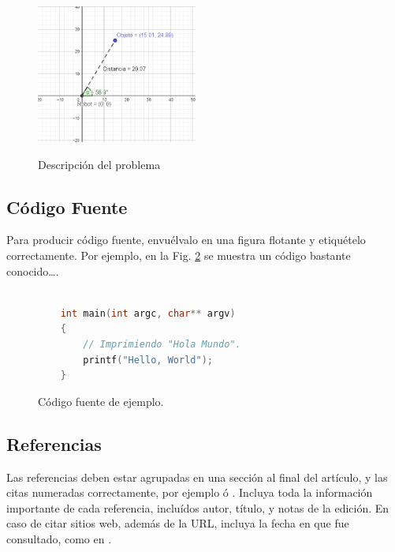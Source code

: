 \documentclass[a4paper,10pt]{article}
\begin{document}
		\begin{figure}[htb]%
		\begin{center}
		\includegraphics[width=200px, height=200px]{images/problem_description.jpg}
		\end{center}
		\caption{Descripción del problema \label{fig:arr}}%
		\end{figure}

	\subsection{Código Fuente}\label{sub:listings}
		Para producir código fuente, envuélvalo en una figura flotante y
		etiquételo correctamente. Por ejemplo, en la Fig. \ref{fig:code}
		se muestra un código bastante conocido\ldots.


		\begin{figure}[htb]%
			\begin{lstlisting}[language=c]%

    int main(int argc, char** argv)
    {
        // Imprimiendo "Hola Mundo".
        printf("Hello, World");
    }

			\end{lstlisting}
		\caption{Código fuente de ejemplo.\label{fig:code}}
		\end{figure}

	\subsection{Referencias}
  	Las referencias deben estar agrupadas en una sección al final del artículo,
  	y las citas numeradas correctamente, por ejemplo \cite{knuth} ó \cite{goedel}.
  	Incluya toda la información importante de cada referencia, incluídos autor,
  	título, y notas de la edición. En caso de citar sitios web, además
  	de la URL, incluya la fecha en que fue consultado, como en \cite{wiki}.
\end{document}
